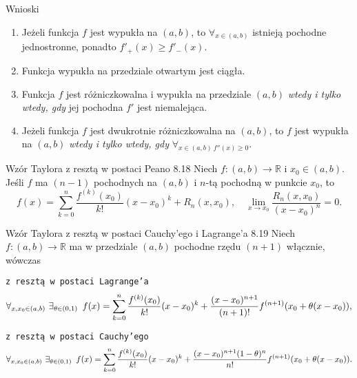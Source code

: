 \documentclass{article}
\newcommand{\hquad}{\mkern9mu}
\newcommand{\R}{\mathbb{R}}
\begin{document}
\begin{wn}{Wnioski}
\begin{enumerate}
    \item Jeżeli funkcja $f$ jest wypukła na $(a,b)$, to $\forall_{x\in(a,b)}$ istnieją pochodne jednostronne, ponadto $f'_{+}(x)\ge f'_{-}(x)$.
    \item Funkcja wypukła na przedziale otwartym jest ciągła.
    \item Funkcja $f$ jest różniczkowalna i wypukła na przedziale $(a,b)$ \textit{wtedy i tylko wtedy, gdy} jej pochodna $f'$ jest niemalejąca.
    \item Jeżeli funkcja $f$ jest dwukrotnie różniczkowalna na $(a,b)$, to $f$ jest wypukła na $(a,b)$ \textit{wtedy i tylko wtedy, gdy} $\forall_{x\in(a,b)\ f''(x)\ge0}$.
\end{enumerate}
\end{wn}

\begin{twier}{Wzór Taylora z resztą w postaci Peano 8.18}
    Niech $f:(a,b)\to\R$ i $x_0\in(a,b)$. Jeśli $f$ ma $(n-1)$ pochodnych na $(a,b)$ i $n$-tą pochodną w punkcie $x_0$, to
    \begin{equation*}
        f(x)=\sum_{k=0}^{n}{\frac{f^{(k)}(x_0)}{k!}(x-x_0)^k}+R_n(x,x_0),\quad \lim_{x\to x_0}{\frac{R_n(x,x_0)}{(x-x_0)^n}}=0.
    \end{equation*}
\end{twier}

\begin{twier}{Wzór Taylora z resztą w postaci Cauchy'ego i Lagrange'a 8.19}
    Niech $f:(a,b)\to\R$ ma w przedziale $(a,b)$ pochodne rzędu $(n+1)$ włącznie, wówczas\medskip

    \hfill \texttt{z resztą w postaci Lagrange'a}\\ 
    \begin{equation*}
        \forall_{x,x_0\in(a,b)}\ \exists_{\theta\in(0,1)}\hquad f(x)=\sum_{k=0}^{n}{\frac{f^{(k)}(x_0)}{k!}(x-x_0)^k}+\frac{(x-x_0)^{n+1}}{(n+1)!}f^{(n+1)}(x_0+\theta(x-x_0)),
    \end{equation*}

    \hfill \texttt{z resztą w postaci Cauchy'ego}\\
    \begin{equation*}
        \forall_{x,x_0\in(a,b)}\ \exists_{\theta\in(0,1)}\hquad f(x)=\sum_{k=0}^{n}{\frac{f^{(k)}(x_0)}{k!}(x-x_0)^k}+\frac{(x-x_0)^{n+1}(1-\theta)^{n}}{n!}f^{(n+1)}(x_0+\theta(x-x_0)).
    \end{equation*}
\end{twier}
\end{document}
